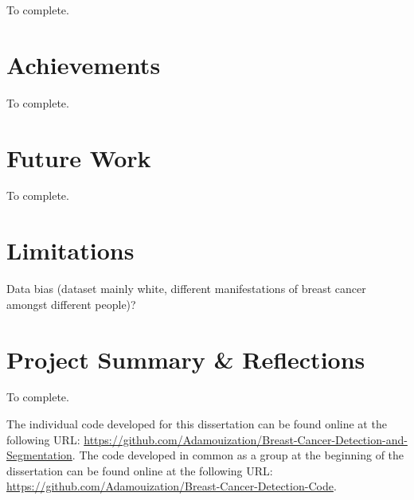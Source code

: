 To complete.


\section{Achievements}

To complete.
    

\section{Future Work}

To complete.


\section{Limitations}
\label{sec:conclusions-limitations}

Data bias (dataset mainly white, different manifestations of breast cancer amongst different people)?
    

\section{Project Summary \& Reflections}

To complete.

The individual code developed for this dissertation can be found online at the following URL: \url{https://github.com/Adamouization/Breast-Cancer-Detection-and-Segmentation}. The code developed in common as a group at the beginning of the dissertation can be found online at the following URL: \url{https://github.com/Adamouization/Breast-Cancer-Detection-Code}.